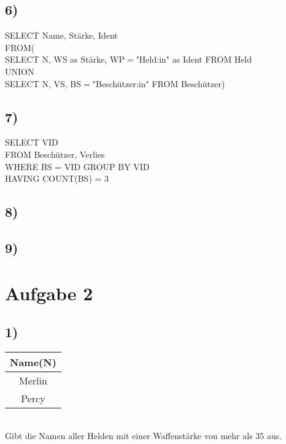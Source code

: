 \documentclass[a4paper,12pt]{article}
\begin{document}
\subsection*{6)}
SELECT Name, Stärke, Ident\\
\vspace{0.1em}\hspace{1em}FROM(\\
\vspace{0.1em}\hspace{2em}SELECT N, WS as Stärke, WP$=$"Held:in" as Ident FROM Held\\
\vspace{0.1em}\hspace{2em}UNION\\
\vspace{0.1em}\hspace{2em}SELECT N, VS, BS$=$"Beschützer:in" FROM Beschützer)\\

\subsection*{7)}
SELECT VID\\
\vspace{0.1em}\hspace{1em}FROM Beschützer, Verlies\\
\vspace{0.1em}\hspace{1em}WHERE BS = VID
\vspace{0.1em}\hspace{1em}GROUP BY VID\\
\vspace{0.1em}\hspace{1em}HAVING COUNT(BS) = 3

\subsection*{8)}

\subsection*{9)}

\section*{Aufgabe 2}
\subsection*{1)}
\begin{tabular}{|c|}
\hline
Name(N)\\
\hline
Merlin\\
Percy\\
\hline
\end{tabular}\\
Gibt die Namen aller Helden mit einer Waffenstärke von mehr als 35 aus.
\end{document}
